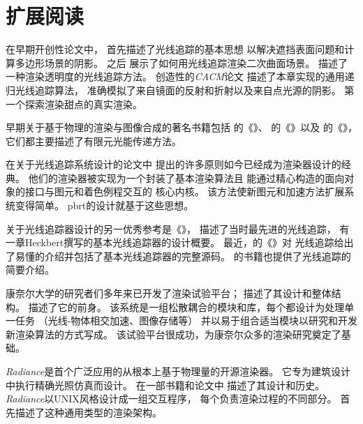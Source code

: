 \section{扩展阅读}\label{sec:扩展阅读1}

在早期开创性论文中，
\citet{10.1145/1468075.1468082}首先描述了光线追踪的基本思想
以解决遮挡表面问题和计算多边形场景的阴影。
\citet{doi:10.1177/003754977101600104}之后
展示了如何用光线追踪渲染二次曲面场景。
\citet{10.1145/800249.807438}描述了
一种渲染透明度的光线追踪方法。
\citet{10.1145/358876.358882}创造性的\emph{CACM}论文
描述了本章实现的通用递归光线追踪算法，
准确模拟了来自镜面的反射和折射以及来自点光源的阴影。
\citet{10.1145/37402.37411}第一个探索渲染甜点的真实渲染。

早期关于基于物理的渲染与图像合成的著名书籍包括
\citet{10.5555/154731}的《》、
\citet{10.5555/561383}的《》以及
\citet{10.5555/200607}的《》，
它们都主要描述了有限元光能传递方法。

\citet{Kirk88theray}在关于光线追踪系统设计的论文中
提出的许多原则如今已经成为渲染器设计的经典。
他们的渲染器被实现为一个封装了基本渲染算法且
能通过精心构造的面向对象的接口与图元和着色例程交互的
核心内核。
该方法使新图元和加速方法扩展系统变得简单。
pbrt的设计就基于这些思想。

关于光线追踪器设计的另一优秀参考是《》\citep{10.5555/94788}，
描述了当时最先进的光线追踪，
有一章Heckbert撰写的基本光线追踪器的设计概要。
最近，\citet{10.5555/940410}的《》对
光线追踪给出了易懂的介绍并包括了基本光线追踪器的完整源码。
\citet{10.5555/1324795}的书籍也提供了光线追踪的简要介绍。

康奈尔大学的研究者们多年来已开发了渲染试验平台；
\citet{egtp.19911035}
描述了其设计和整体结构。
\citet{4037684}描述了它的前身。
该系统是一组松散耦合的模块和库，每个都设计为处理单一任务
（光线-物体相交加速、图像存储等）
并以易于组合适当模块以研究和开发新渲染算法的方式写成。
该试验平台很成功，为康奈尔众多的渲染研究奠定了基础。

\emph{Radiance}是首个广泛应用的从根本上基于物理量的开源渲染器。
它专为建筑设计中执行精确光照仿真而设计。
\citeauthor{10.1145/192161.192286}在一部书籍和论文中
\citep{10.1145/192161.192286,10.5555/286090}描述了其设计和历史。
\emph{Radiance}以UNIX风格设计成一组交互程序，
每个负责渲染过程的不同部分。
\citet{10.1145/325334.325174}首先描述了这种通用类型的渲染架构。

